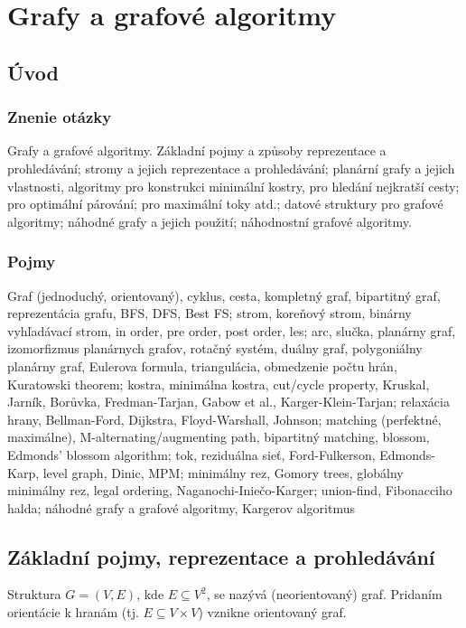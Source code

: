 \section{Grafy a grafové algoritmy}

\subsection{Úvod}
\subsubsection{Znenie otázky}
Grafy a grafové algoritmy. Základní pojmy a způsoby reprezentace
a prohledávání; stromy a jejich reprezentace a prohledávání; planární 
grafy a jejich vlastnosti, algoritmy pro konstrukci minimální kostry, 
pro hledání nejkratší cesty; pro optimální párování; pro maximální 
toky atd.; datové struktury pro grafové algoritmy; náhodné grafy a 
jejich použití; náhodnostní grafové algoritmy.

\subsubsection{Pojmy}
Graf (jednoduchý, orientovaný), cyklus, cesta, kompletný graf,
bipartitný graf, reprezentácia grafu, BFS, DFS, Best FS; strom,
koreňový strom, binárny vyhľadávací strom, in order, pre order,
post order, les; arc, slučka, planárny graf, izomorfizmus planárnych
grafov, rotačný systém, duálny graf, polygoniálny planárny graf,
Eulerova formula, triangulácia, obmedzenie počtu hrán, Kuratowski theorem;
kostra, minimálna kostra, cut/cycle property, Kruskal, Jarník, 
Borůvka, Fredman-Tarjan, Gabow et al., Karger-Klein-Tarjan;
relaxácia hrany, Bellman-Ford, Dijkstra, Floyd-Warshall, Johnson;
matching (perfektné, maximálne), M-alternating/augmenting path,
bipartitný matching, blossom, Edmonds' blossom algorithm;
tok, reziduálna sieť, Ford-Fulkerson, Edmonds-Karp, level graph,
Dinic, MPM; minimálny rez, Gomory trees, globálny minimálny rez,
legal ordering, Naganochi-Iniečo-Karger;
union-find, Fibonacciho halda; náhodné grafy a grafové algoritmy,
Kargerov algoritmus

\subsection{Základní pojmy, reprezentace a prohledávání}

Struktura $G = (V, E)$, kde $E \subseteq V^2$, se nazývá (neorientovaný) graf.
Pridaním orientácie k hranám (tj. $E \subseteq V \times V$) vznikne orientovaný graf.

